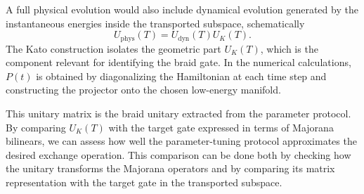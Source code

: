 A full physical evolution would also include dynamical evolution generated by the instantaneous energies inside the transported subspace, schematically
\[
U_{\mathrm{phys}}(T)
=
U_{\mathrm{dyn}}(T)U_K(T).
\]
The Kato construction isolates the geometric part $U_K(T)$, which is the component relevant for identifying the braid gate. In the numerical calculations, $P(t)$ is obtained by diagonalizing the Hamiltonian at each time step and constructing the projector onto the chosen low-energy manifold.

This unitary matrix is the braid unitary extracted from the parameter protocol. By comparing $U_K(T)$ with the target gate expressed in terms of Majorana bilinears, we can assess how well the parameter-tuning protocol approximates the desired exchange operation. This comparison can be done both by checking how the unitary transforms the Majorana operators and by comparing its matrix representation with the target gate in the transported subspace.\\

